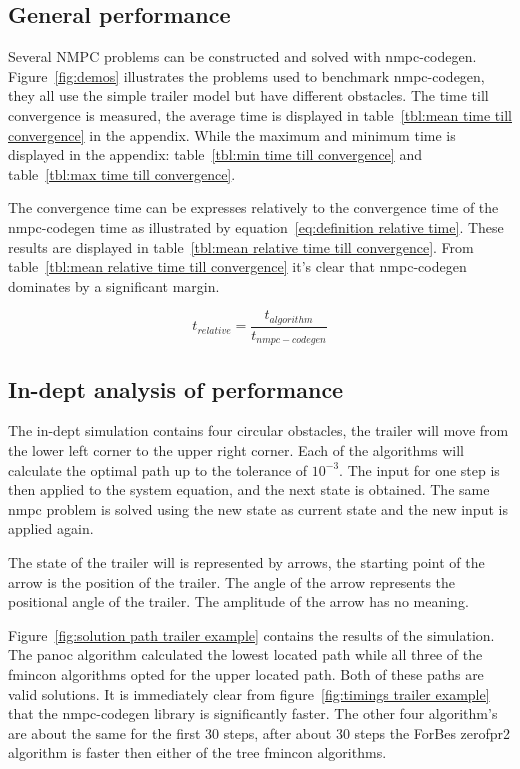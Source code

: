 \subsection{General performance}
Several NMPC problems can be constructed and solved with nmpc-codegen. Figure~\ref{fig:demos} illustrates the problems used to benchmark nmpc-codegen, they all use the simple trailer model but have different obstacles. The time till convergence is measured, the average time is displayed in table~\ref{tbl:mean time till convergence} in the appendix. While the maximum and minimum time is displayed in the appendix: table~\ref{tbl:min time till convergence} and table~\ref{tbl:max time till convergence}.

The convergence time can be expresses relatively to the convergence time of the nmpc-codegen time as illustrated by equation~\ref{eq:definition relative time}. These results are displayed in table~\ref{tbl:mean relative time till convergence}. From table~\ref{tbl:mean relative time till convergence} it's clear that nmpc-codegen dominates by a significant margin.

\begin{equation}
	t_{relative} = \frac{t_{algorithm}}{t_{nmpc-codegen}}
	\label{eq:definition relative time}
\end{equation}

\subsection{In-dept analysis of performance}
The in-dept simulation contains four circular obstacles, the trailer will move from the lower left corner to the upper right corner. Each of the algorithms will calculate the optimal path up to the tolerance of $10^{-3}$. The input for one step is then applied to the system equation, and the next state is obtained. The same nmpc problem is solved using the new state as current state  and the new input is applied again.

The state of the trailer will is represented by arrows, the starting point of the arrow is the position of the trailer. The angle of the arrow represents the positional angle of the trailer. The amplitude of the arrow has no meaning.

Figure~\ref{fig:solution path trailer example} contains the results of the simulation. The panoc algorithm calculated the lowest located path while all three of the fmincon algorithms opted for the upper located path. Both of these paths are valid solutions. It is immediately clear from figure~\ref{fig:timings trailer example} that the nmpc-codegen library is significantly faster. The other four algorithm's are about the same for the first 30 steps, after about 30 steps the ForBes zerofpr2 algorithm is faster then either of the tree fmincon algorithms.

